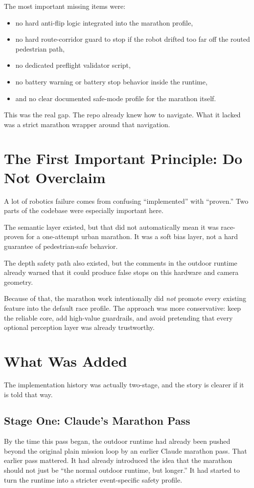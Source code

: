\documentclass[11pt]{article}
\begin{document}
The most important missing items were:
\begin{itemize}[leftmargin=*]
\item no hard anti-flip logic integrated into the marathon profile,
\item no hard route-corridor guard to stop if the robot drifted too far off the routed pedestrian path,
\item no dedicated preflight validator script,
\item no battery warning or battery stop behavior inside the runtime,
\item and no clear documented safe-mode profile for the marathon itself.
\end{itemize}

This was the real gap. The repo already knew how to navigate. What it lacked was a strict marathon wrapper around that navigation.

\section{The First Important Principle: Do Not Overclaim}
A lot of robotics failure comes from confusing ``implemented'' with ``proven.'' Two parts of the codebase were especially important here.

The semantic layer existed, but that did not automatically mean it was race-proven for a one-attempt urban marathon. It was a soft bias layer, not a hard guarantee of pedestrian-safe behavior.

The depth safety path also existed, but the comments in the outdoor runtime already warned that it could produce false stops on this hardware and camera geometry.

Because of that, the marathon work intentionally did \emph{not} promote every existing feature into the default race profile. The approach was more conservative: keep the reliable core, add high-value guardrails, and avoid pretending that every optional perception layer was already trustworthy.

\section{What Was Added}
The implementation history was actually two-stage, and the story is clearer if it is told that way.

\subsection{Stage One: Claude's Marathon Pass}
By the time this pass began, the outdoor runtime had already been pushed beyond the original plain mission loop by an earlier Claude marathon pass. That earlier pass mattered. It had already introduced the idea that the marathon should not just be ``the normal outdoor runtime, but longer.'' It had started to turn the runtime into a stricter event-specific safety profile.
\end{document}
